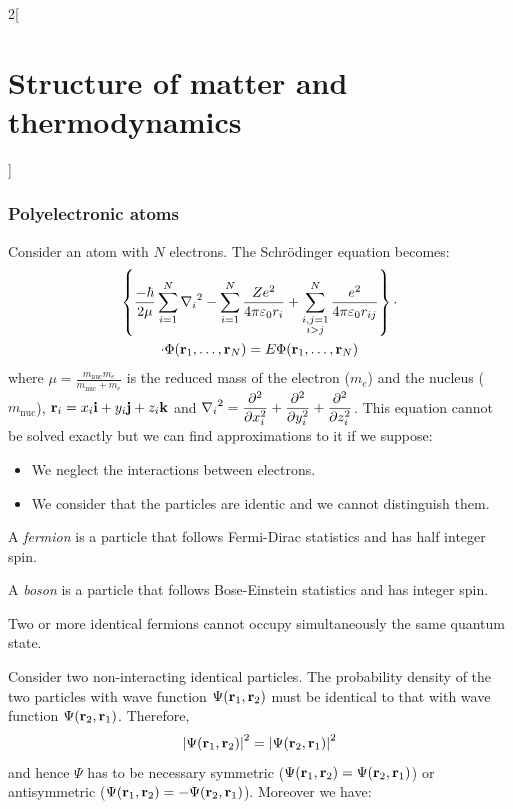 \documentclass[../../../main.tex]{subfiles}
\begin{document}
\begin{multicols}{2}[\section{Structure of matter and thermodynamics}]
    \subsubsection*{Polyelectronic atoms}
    \begin{prop}
        Consider an atom with $N$ electrons. The Schrödinger equation becomes:
        \begin{multline*}
            \left\{\frac{-\hbar}{2\mu}\sum_{i=1}^N{\nabla_i}^2-\sum_{i=1}^N\frac{Ze^2}{4\pi\varepsilon_0r_i}+\sum_{\substack{i,j=1\\i>j}}^N\frac{e^2}{4\pi\varepsilon_0r_{ij}}\right\}\cdot\\\cdot\Phi(\vb{r}_1,\ldots,\vb{r}_N)=E\Phi(\vb{r}_1,\ldots,\vb{r}_N)
        \end{multline*}
        where $\displaystyle\mu=\frac{m_\text{nuc}m_e}{m_\text{nuc}+m_e}$ is the reduced mass of the electron ($m_e$) and the nucleus ($m_\text{nuc}$), $\vb{r}_i=x_i\vb{i}+y_i\vb{j}+z_i\vb{k}$ and $\displaystyle{\nabla_i}^2=\pdv[2]{}{x_i}+\pdv[2]{}{y_i}+\pdv[2]{}{z_i}$.
        This equation cannot be solved exactly but we can find approximations to it if we suppose:
        \begin{itemize}
            \item We neglect the interactions between electrons.
            \item We consider that the particles are identic and we cannot distinguish them.
        \end{itemize}
    \end{prop}
    \begin{definition}[Fermions]
        A \textit{fermion} is a particle that follows Fermi-Dirac statistics and has half integer spin.
    \end{definition}
    \begin{definition}[Boson]
        A \textit{boson} is a particle that follows Bose-Einstein statistics and has integer spin.
    \end{definition}
    \begin{prop}
        Two or more identical fermions cannot occupy simultaneously the same quantum state.
    \end{prop}
    \begin{prop}
        Consider two non-interacting identical particles. The probability density of the two particles with wave function $\Psi(\vb{r}_1,\vb{r}_2)$ must be identical to that with wave function $\Psi(\vb{r}_2,\vb{r}_1)$. Therefore, $${|\Psi(\vb{r}_1,\vb{r}_2)|}^2={|\Psi(\vb{r}_2,\vb{r}_1)|}^2$$ and hence $\Psi$ has to be necessary symmetric ($\Psi(\vb{r}_1,\vb{r}_2)=\Psi(\vb{r}_2,\vb{r}_1)$) or antisymmetric ($\Psi(\vb{r}_1,\vb{r}_2)=-\Psi(\vb{r}_2,\vb{r}_1)$). Moreover we have:

\end{prop}
\end{multicols}
\end{document}
